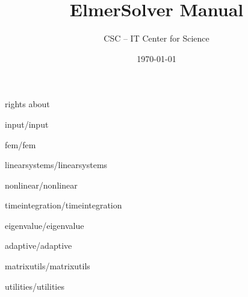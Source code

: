 \documentclass[a4paper,english]{report}    %
\title{\Huge{\bf ElmerSolver Manual}}
\author{CSC -- IT Center for Science}
\date{\today}
\newcommand{\Include}{}
\begin{document}
\maketitle

\begin{versiona}
\Include{rights}
\Include{about}

\pagestyle{empty}
\setcounter{secnumdepth}{2}
\setcounter{tocdepth}{1}  
\tableofcontents

\newpage

\pagestyle{fancy}
\fancyhead{}
\fancyhead[LE,LO]{\bfseries \rightmark}
\fancyhead[RE,RO]{\bfseries \thepage}
\fancyfoot{}
\renewcommand{\headrulewidth}{0.4pt}
\renewcommand{\footrulewidth}{0.4pt}

\end{versiona}



\graphicspath{{./}{input/}}
\Include{input/input}

\begin{versiona}
\graphicspath{{./}{fem/}}
\Include{fem/fem}
\end{versiona}

\graphicspath{{./}{linearsystems/}}
\Include{linearsystems/linearsystems}

\graphicspath{{./}{nonlinear/}}
\Include{nonlinear/nonlinear}

\graphicspath{{./}{timeintegration/}}
\Include{timeintegration/timeintegration}

\graphicspath{{./}{eigenvalue/}}
\Include{eigenvalue/eigenvalue}

\graphicspath{{./}{adaptive/}}
\Include{adaptive/adaptive}

\graphicspath{{./}{matrixutils/}}
\Include{matrixutils/matrixutils}

\graphicspath{{./}{utilities/}}
\Include{utilities/utilities}
\end{document}
